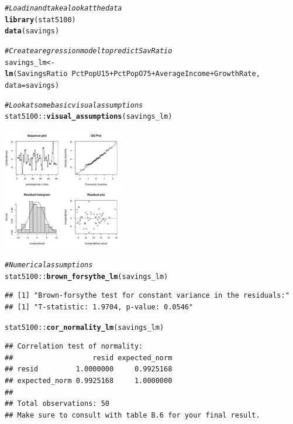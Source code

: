 \documentclass{article}\usepackage[]{graphicx}\usepackage[]{color}
\makeatletter
\newcommand{\hlcom}[1]{\textcolor[rgb]{0.678,0.584,0.686}{\textit{#1}}}%
\newcommand{\hlopt}[1]{\textcolor[rgb]{0,0,0}{#1}}%
\newcommand{\hlstd}[1]{\textcolor[rgb]{0.345,0.345,0.345}{#1}}%
\newcommand{\hlkwb}[1]{\textcolor[rgb]{0.69,0.353,0.396}{#1}}%
\newcommand{\hlkwc}[1]{\textcolor[rgb]{0.333,0.667,0.333}{#1}}%
\newcommand{\hlkwd}[1]{\textcolor[rgb]{0.737,0.353,0.396}{\textbf{#1}}}%
\newenvironment{kframe}{%
 \def\at@end@of@kframe{}%
 \ifinner\ifhmode%
  \def\at@end@of@kframe{\end{minipage}}%
  \begin{minipage}{\columnwidth}%
 \fi\fi%
 \def\FrameCommand##1{\hskip\@totalleftmargin \hskip-\fboxsep
 \colorbox{shadecolor}{##1}\hskip-\fboxsep
     \hskip-\linewidth \hskip-\@totalleftmargin \hskip\columnwidth}%
 \MakeFramed {\advance\hsize-\width
   \@totalleftmargin\z@ \linewidth\hsize
   \@setminipage}}%
 {\par\unskip\endMakeFramed%
 \at@end@of@kframe}
\newenvironment{knitrout}{}{} %
\makeatother
\begin{document}
\begin{knitrout}
\color{fgcolor}\begin{kframe}
\begin{alltt}
\hlcom{# Load in and take a look at the data}
\hlkwd{library}\hlstd{(stat5100)}
\hlkwd{data}\hlstd{(savings)}

\hlcom{# Create a regression model to predict SavRatio}
\hlstd{savings_lm} \hlkwb{<-} \hlkwd{lm}\hlstd{(SavingsRatio} \hlopt{~} \hlstd{PctPopU15} \hlopt{+} \hlstd{PctPopO75} \hlopt{+} \hlstd{AverageIncome} \hlopt{+} \hlstd{GrowthRate,}
                 \hlkwc{data} \hlstd{= savings)}

\hlcom{# Look at some basic visual assumptions}
\hlstd{stat5100}\hlopt{::}\hlkwd{visual_assumptions}\hlstd{(savings_lm)}
\end{alltt}
\end{kframe}

{\centering \includegraphics[width=0.4\textwidth]{figure/unnamed-chunk-1-1} 

}


\begin{kframe}\begin{alltt}
\hlcom{# Numerical assumptions}
\hlstd{stat5100}\hlopt{::}\hlkwd{brown_forsythe_lm}\hlstd{(savings_lm)}
\end{alltt}
\begin{verbatim}
## [1] "Brown-forsythe test for constant variance in the residuals:"
## [1] "T-statistic: 1.9704, p-value: 0.0546"
\end{verbatim}
\begin{alltt}
\hlstd{stat5100}\hlopt{::}\hlkwd{cor_normality_lm}\hlstd{(savings_lm)}
\end{alltt}
\begin{verbatim}
## Correlation test of normality:
##                   resid expected_norm
## resid         1.0000000     0.9925168
## expected_norm 0.9925168     1.0000000
## 
## Total observations: 50
## Make sure to consult with table B.6 for your final result.
\end{verbatim}
\end{kframe}
\end{knitrout}
\end{document}
